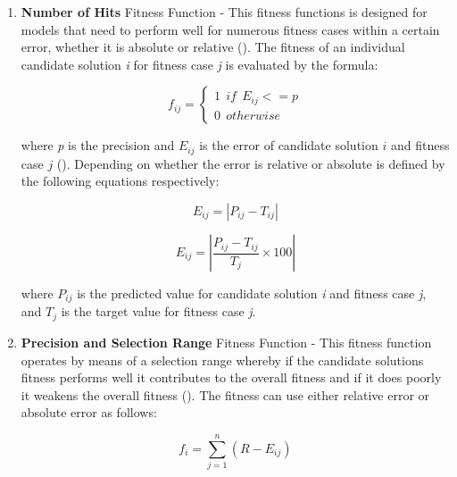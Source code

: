 \begin{enumerate}
    \item \textbf{Number of Hits} Fitness Function - This fitness functions is designed for models that need to perform well for numerous fitness cases within a certain error, whether it is absolute or relative (\cite{ferreira2006gene}). The fitness of an individual candidate solution \textit{i} for fitness case \textit{j} is evaluated by the formula:
    \begin{ceqn}
        \begin{equation}\label{alg:number_of_hits}
            f_{ij} =
            \begin{cases} 
                1 \:\: if \:\: E_{ij}  <= p\\
                0 \:\: otherwise
            \end{cases}
        \end{equation}
    \end{ceqn}

    \noindent where \textit{p} is the precision and \textit{$E_{ij}$} is the error of candidate solution $i$ and fitness case $j$ (\cite{ferreira2006gene}). Depending on whether the error is relative or absolute is defined by the following equations respectively:

    \begin{ceqn}
        \begin{equation}\label{alg:relative_error}
            E_{ij} = |P_{ij} - T_{ij}|
        \end{equation}
    \end{ceqn}

    \begin{ceqn}
        \begin{equation}\label{alg:absolute_error}
            E_{ij} = |\frac{P_{ij} - T_{ij}}{T_j} \times 100|
        \end{equation}
    \end{ceqn}

    \noindent where \textit{$P_{ij}$} is the predicted value for candidate solution \textit{i} and fitness case \textit{j}, and \textit{$T_j$} is the target value for fitness case \textit{j}.

    \item \textbf{Precision and Selection Range} Fitness Function - This fitness function operates by means of a selection range whereby if the candidate solutions fitness performs well it contributes to the overall fitness and if it does poorly it weakens the overall fitness (\cite{ferreira2006gene}). The fitness can use either relative error or absolute error as follows:
    \begin{ceqn}
        \begin{equation}\label{alg:relative_error2}
            f_i = \sum_{j=1}^{n}(R-E_{ij})
        \end{equation}
    \end{ceqn}


\end{enumerate}
